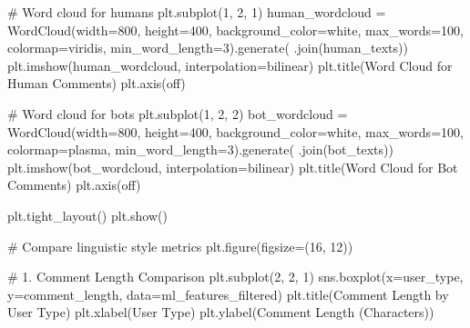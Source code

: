 \documentclass[
  12pt,
  letterpaper,
  DIV=11,
  numbers=noendperiod]{scrartcl}
\newenvironment{Shaded}{\begin{snugshade}}{\end{snugshade}}
\newcommand{\CommentTok}[1]{\textcolor[rgb]{0.37,0.37,0.37}{#1}}
\newcommand{\DecValTok}[1]{\textcolor[rgb]{0.68,0.00,0.00}{#1}}
\newcommand{\NormalTok}[1]{\textcolor[rgb]{0.00,0.23,0.31}{#1}}
\newcommand{\OperatorTok}[1]{\textcolor[rgb]{0.37,0.37,0.37}{#1}}
\newcommand{\StringTok}[1]{\textcolor[rgb]{0.13,0.47,0.30}{#1}}
\begin{document}
\begin{Shaded}
\begin{Highlighting}[]
\CommentTok{\# Word cloud for humans}
\NormalTok{plt.subplot(}\DecValTok{1}\NormalTok{, }\DecValTok{2}\NormalTok{, }\DecValTok{1}\NormalTok{)}
\NormalTok{human\_wordcloud }\OperatorTok{=}\NormalTok{ WordCloud(width}\OperatorTok{=}\DecValTok{800}\NormalTok{, height}\OperatorTok{=}\DecValTok{400}\NormalTok{, background\_color}\OperatorTok{=}\StringTok{\textquotesingle{}white\textquotesingle{}}\NormalTok{, }
\NormalTok{                           max\_words}\OperatorTok{=}\DecValTok{100}\NormalTok{, colormap}\OperatorTok{=}\StringTok{\textquotesingle{}viridis\textquotesingle{}}\NormalTok{, min\_word\_length}\OperatorTok{=}\DecValTok{3}\NormalTok{).generate(}\StringTok{\textquotesingle{} \textquotesingle{}}\NormalTok{.join(human\_texts))}
\NormalTok{plt.imshow(human\_wordcloud, interpolation}\OperatorTok{=}\StringTok{\textquotesingle{}bilinear\textquotesingle{}}\NormalTok{)}
\NormalTok{plt.title(}\StringTok{\textquotesingle{}Word Cloud for Human Comments\textquotesingle{}}\NormalTok{)}
\NormalTok{plt.axis(}\StringTok{\textquotesingle{}off\textquotesingle{}}\NormalTok{)}

\CommentTok{\# Word cloud for bots}
\NormalTok{plt.subplot(}\DecValTok{1}\NormalTok{, }\DecValTok{2}\NormalTok{, }\DecValTok{2}\NormalTok{)}
\NormalTok{bot\_wordcloud }\OperatorTok{=}\NormalTok{ WordCloud(width}\OperatorTok{=}\DecValTok{800}\NormalTok{, height}\OperatorTok{=}\DecValTok{400}\NormalTok{, background\_color}\OperatorTok{=}\StringTok{\textquotesingle{}white\textquotesingle{}}\NormalTok{, }
\NormalTok{                         max\_words}\OperatorTok{=}\DecValTok{100}\NormalTok{, colormap}\OperatorTok{=}\StringTok{\textquotesingle{}plasma\textquotesingle{}}\NormalTok{, min\_word\_length}\OperatorTok{=}\DecValTok{3}\NormalTok{).generate(}\StringTok{\textquotesingle{} \textquotesingle{}}\NormalTok{.join(bot\_texts))}
\NormalTok{plt.imshow(bot\_wordcloud, interpolation}\OperatorTok{=}\StringTok{\textquotesingle{}bilinear\textquotesingle{}}\NormalTok{)}
\NormalTok{plt.title(}\StringTok{\textquotesingle{}Word Cloud for Bot Comments\textquotesingle{}}\NormalTok{)}
\NormalTok{plt.axis(}\StringTok{\textquotesingle{}off\textquotesingle{}}\NormalTok{)}

\NormalTok{plt.tight\_layout()}
\NormalTok{plt.show()}

\CommentTok{\# Compare linguistic style metrics}
\NormalTok{plt.figure(figsize}\OperatorTok{=}\NormalTok{(}\DecValTok{16}\NormalTok{, }\DecValTok{12}\NormalTok{))}

\CommentTok{\# 1. Comment Length Comparison}
\NormalTok{plt.subplot(}\DecValTok{2}\NormalTok{, }\DecValTok{2}\NormalTok{, }\DecValTok{1}\NormalTok{)}
\NormalTok{sns.boxplot(x}\OperatorTok{=}\StringTok{\textquotesingle{}user\_type\textquotesingle{}}\NormalTok{, y}\OperatorTok{=}\StringTok{\textquotesingle{}comment\_length\textquotesingle{}}\NormalTok{, data}\OperatorTok{=}\NormalTok{ml\_features\_filtered)}
\NormalTok{plt.title(}\StringTok{\textquotesingle{}Comment Length by User Type\textquotesingle{}}\NormalTok{)}
\NormalTok{plt.xlabel(}\StringTok{\textquotesingle{}User Type\textquotesingle{}}\NormalTok{)}
\NormalTok{plt.ylabel(}\StringTok{\textquotesingle{}Comment Length (Characters)\textquotesingle{}}\NormalTok{)}


\end{Highlighting}
\end{Shaded}
\end{document}

